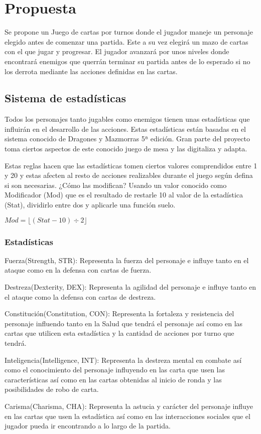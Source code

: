 \section{Propuesta}
Se propone un Juego de cartas por turnos donde el jugador maneje un personaje elegido antes de comenzar una partida. Este a su vez elegirá un mazo de cartas con el que jugar y progresar. El jugador avanzará por unos niveles donde encontrará enemigos que querrán terminar su partida antes de lo esperado si no los derrota mediante las acciones definidas en las cartas. 
\subsection{Sistema de estadísticas}
Todos los personajes tanto jugables como enemigos tienen unas estadísticas que influirán en el desarrollo de las acciones. Estas estadísticas están basadas en el sistema conocido de Dragones y Mazmorras 5ª edición. Gran parte del proyecto toma ciertos aspectos de este conocido juego de mesa y las digitaliza y adapta.

Estas reglas hacen que las estadísticas tomen ciertos valores comprendidos entre 1 y 20 y estas afecten al resto de acciones realizables durante el juego según defina si son necesarias. ¿Cómo las modifican? Usando un valor conocido como Modificador (Mod) que es el resultado de restarle 10 al valor de la estadística (Stat), dividirlo entre dos y aplicarle una función suelo.
\begin{center}
    $Mod = \lfloor (Stat - 10) \div 2 \rfloor$
\end{center}

\subsubsection{Estadísticas}
\begin{list}{Estadísticas}{spacing}
    \item[Fuerza(Strength, STR):] Representa la fuerza del personaje e influye tanto en el ataque como en la defensa con cartas de fuerza.
    \item[Destreza(Dexterity, DEX):] Representa la agilidad del personaje e influye tanto en el ataque como la defensa con cartas de destreza.
    \item[Constitución(Constitution, CON):] Representa la fortaleza y resistencia del personaje influendo tanto en la Salud que tendrá el personaje así como en las cartas que utilicen esta estadística y la cantidad de acciones por turno que tendrá.
    \item[Inteligencia(Intelligence, INT):] Representa la destreza mental en combate así como el conocimiento del personaje influyendo en las carta que usen las características así como en las cartas obtenidas al inicio de ronda y las posibilidades de robo de carta.
    \item[Carisma(Charisma, CHA):] Representa la astucia y carácter del personaje influye en las cartas que usen la estadística así como en las interacciones sociales que el jugador pueda ir encontrando a lo largo de la partida.
\end{list}


